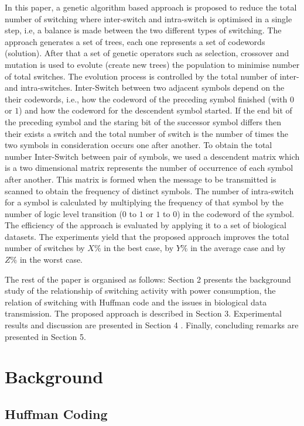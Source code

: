 \documentclass[preprint,12pt]{elsarticle}
\begin{document}
In this paper, a genetic algorithm based approach is proposed to reduce the total number of switching where inter-switch and intra-switch is optimised in a single step, i.e, a balance is made between the two different types of switching. The approach generates a set of trees, each one represents a set of codewords (solution). After that a set of genetic operators such as selection, crossover and mutation is used to evolute (create new trees) the population to minimise number of total switches. The evolution process is controlled by the total number of inter- and intra-switches.  Inter-Switch between two adjacent symbols depend on the their codewords, i.e., how the codeword of the preceding symbol finished (with $0$ or $1$) and how the codeword for the descendent symbol started. If the end bit of the preceding symbol and the staring bit of the successor symbol differs then their exists a switch and the total number of switch is the number of times the two symbols in consideration occurs one after another. To obtain the total number Inter-Switch between pair of symbols, we used a descendent matrix which is a two dimensional matrix represents the number of occurrence of each symbol after another. This matrix is formed when the message to be transmitted is scanned to obtain the frequency of distinct symbols. The number of intra-switch for a symbol is calculated by multiplying the frequency of that symbol by the number of logic level transition ($0$ to $1$ or $1$ to $0$) in the codeword of the symbol. The efficiency of the approach is evaluated by applying it to a set of biological datasets. The experiments yield that the proposed approach improves the total number of switches by $X\%$ in the best case, by $Y\%$ in the average case and by $Z\%$
in the worst case.

The rest of the paper is organised as follows:
Section 2 presents the background study of the
relationship of switching activity with power consumption, the relation of switching with Huffman code and the issues in biological data transmission. The proposed approach is described in Section 3. Experimental results and
discussion are presented in Section 4 . Finally,
concluding remarks are presented in Section 5. 



\section{Background}
\subsection{Huffman Coding}
\end{document}
